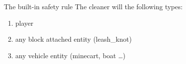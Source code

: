 \begin{samepage}
    \begin{note}{The built-in safety rule}
        The cleaner will  the following types:
        \begin{enumerate}
            \item player
            \item any block attached entity (\eg leash\_knot)
            \item any vehicle entity (\eg minecart, boat \ldots)
        \end{enumerate}
    \end{note}
\end{samepage}


